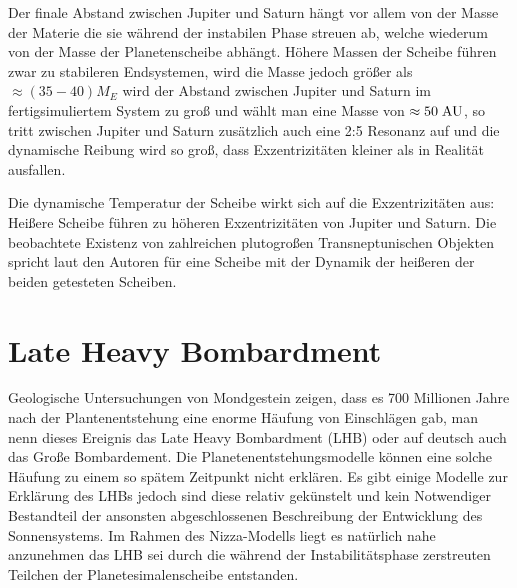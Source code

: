 \documentclass[10pt,a4paper,twoside]{article}
\begin{document}
Der finale Abstand zwischen Jupiter und Saturn hängt vor allem von der Masse der Materie %
die sie während der instabilen Phase streuen ab, welche wiederum von der Masse der Planetenscheibe abhängt\cite{Tsiganis2005}. %
Höhere Massen der Scheibe führen zwar zu stabileren Endsystemen, wird die Masse jedoch größer als $\approx (35-40) M_E$ wird der Abstand zwischen Jupiter und Saturn im fertigsimuliertem System zu groß\cite{Tsiganis2005} und wählt man eine Masse von $\approx 50 \;\mathrm{AU}$, so tritt zwischen Jupiter und Saturn zusätzlich auch eine 2:5 Resonanz auf und die dynamische Reibung wird so groß, dass Exzentrizitäten kleiner als in Realität ausfallen\cite{Tsiganis2005}.

Die dynamische Temperatur der Scheibe wirkt sich auf die Exzentrizitäten aus: Heißere Scheibe führen zu höheren Exzentrizitäten von Jupiter und Saturn. Die beobachtete Existenz von zahlreichen plutogroßen Transneptunischen Objekten spricht laut den Autoren für eine Scheibe mit der Dynamik der heißeren der beiden getesteten Scheiben\cite{Tsiganis2005}. %



\section{Late Heavy Bombardment}\label{LHB}
Geologische Untersuchungen von Mondgestein zeigen, dass es 700 Millionen Jahre nach der Plantenentstehung
eine enorme Häufung von Einschlägen gab, man nenn dieses Ereignis das Late Heavy Bombardment (LHB) oder auf deutsch auch das Große Bombardement.
Die Planetenentstehungsmodelle können eine solche Häufung zu einem so spätem Zeitpunkt nicht erklären.
Es gibt einige Modelle zur Erklärung des LHBs jedoch sind diese relativ gekünstelt und kein Notwendiger Bestandteil der ansonsten abgeschlossenen Beschreibung der Entwicklung des Sonnensystems.\cite{Gomes2005} %
Im Rahmen des Nizza-Modells liegt es natürlich nahe anzunehmen das LHB sei durch die während der Instabilitätsphase zerstreuten Teilchen der Planetesimalenscheibe entstanden. %
\end{document}
